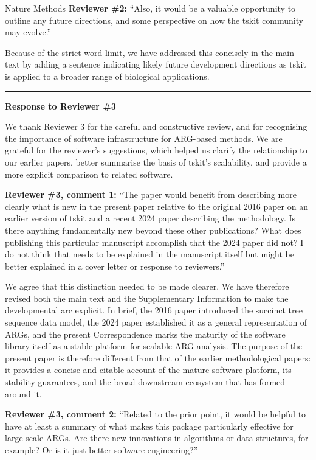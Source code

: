 \documentclass{letter}
\begin{document}
\begin{letter}{Nature Methods}
\noindent \textbf{Reviewer \#2:} ``Also, it would be a valuable opportunity to
outline any future directions, and some perspective on how the tskit community
may evolve.''

Because of the strict word limit, we have addressed this concisely in
the main text by adding a sentence indicating likely future development
directions as tskit is applied to a broader range of biological applications.

\medskip
\hrule
\medskip

\noindent \textbf{Response to Reviewer \#3}

We thank Reviewer 3 for the careful and constructive review, and for
recognising the importance of software infrastructure for ARG-based methods. We
are grateful for the reviewer’s suggestions, which helped us clarify the
relationship to our earlier papers, better summarise the basis of tskit’s
scalability, and provide a more explicit comparison to related software.

\noindent \textbf{Reviewer \#3, comment 1:} ``The paper would benefit from
describing more clearly what is new in the present paper relative to the
original 2016 paper on an earlier version of tskit and a recent 2024 paper
describing the methodology. Is there anything fundamentally new beyond these
other publications? What does publishing this particular manuscript accomplish
that the 2024 paper did not? I do not think that needs to be explained in the
manuscript itself but might be better explained in a cover letter or response
to reviewers.''

We agree that this distinction needed to be made clearer. We have therefore
revised both the main text and the Supplementary Information to make the
developmental arc explicit. In brief, the 2016 paper introduced the succinct
tree sequence data model, the 2024 paper established it as a general
representation of ARGs, and the present Correspondence marks the maturity of
the software library itself as a stable platform for scalable ARG analysis. The
purpose of the present paper is therefore different from that of the earlier
methodological papers: it provides a concise and citable account of the mature
software platform, its stability guarantees, and the broad downstream ecosystem
that has formed around it.

\noindent \textbf{Reviewer \#3, comment 2:} ``Related to the prior point, it
would be helpful to have at least a summary of what makes this package
particularly effective for large-scale ARGs. Are there new innovations in
algorithms or data structures, for example? Or is it just better software
engineering?''


\end{letter}
\end{document}

